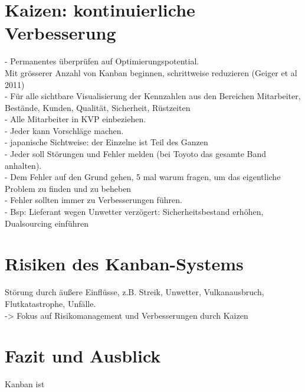 \section{Kaizen: kontinuierliche Verbesserung}
- Permanentes überprüfen auf Optimierungspotential.\\
Mit grösserer Anzahl von Kanban beginnen, schrittweise reduzieren (Geiger et al 2011)\\
- Für alle sichtbare Visualisierung der Kennzahlen aus den Bereichen Mitarbeiter, Bestände, Kunden, Qualität, Sicherheit, Rüstzeiten\\
- Alle Mitarbeiter in KVP einbeziehen.\\
- Jeder kann Vorschläge machen.\\
- japanische Sichtweise: der Einzelne ist Teil des Ganzen\\
- Jeder soll Störungen und Fehler melden (bei Toyoto das gesamte Band anhalten).\\
- Dem Fehler auf den Grund gehen, 5 mal warum fragen, um das eigentliche Problem zu finden und zu beheben\\
- Fehler sollten immer zu Verbesserungen führen.\\
- Bsp: Lieferant wegen Unwetter verzögert: Sicherheitsbestand erhöhen, Dualsourcing einführen\\

\section{Risiken des Kanban-Systems}
Störung durch äußere Einflüsse, z.B. Streik, Unwetter, Vulkanausbruch, Flutkatastrophe, Unfälle.\\
-> Fokus auf Risikomanagement und Verbesserungen durch Kaizen\\

\section{Fazit und Ausblick}
Kanban ist 
